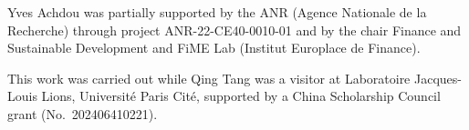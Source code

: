 \documentclass[11pt]{article}
\numberwithin{equation}{section}
\theoremstyle{definition}
\theoremstyle{plain}
\begin{document}
\bigskip
{}
\small{Yves Achdou was  partially supported by the ANR (Agence Nationale de la Recherche) through project ANR-22-CE40-0010-01 and  by the chair Finance and Sustainable Development and FiME Lab (Institut Europlace de Finance).\par
This work was carried out while Qing Tang was a visitor at Laboratoire Jacques-Louis Lions, Universit\'e Paris Cit\'e, supported by a China Scholarship Council grant (No.~202406410221).}

 \small
 
 

\end{document}
